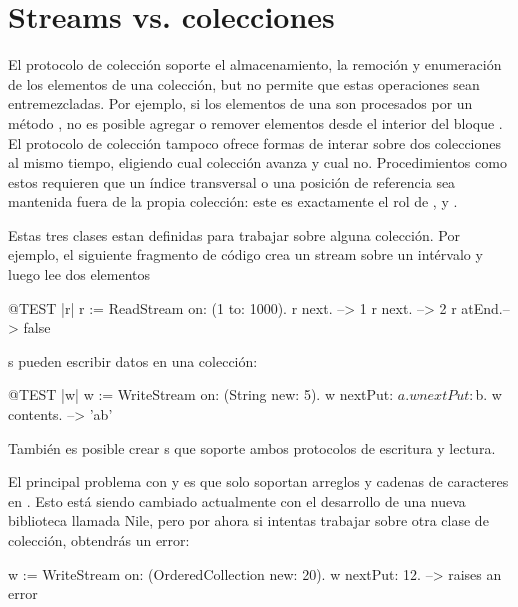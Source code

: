 \documentclass[a4paper,10pt,twoside]{book}
\begin{document}
\section{Streams vs. colecciones}

El protocolo de colecci\'on soporte el almacenamiento, la remoci\'on y enumeraci\'on de los elementos de una colecci\'on, 
but no permite que estas operaciones sean entremezcladas.  Por ejemplo, si los elementos de una  son
procesados por un m\'etodo , no es posible agregar o remover elementos desde el interior del bloque .
El protocolo de colecci\'on tampoco ofrece formas de interar sobre dos colecciones al mismo tiempo, eligiendo cual colecci\'on avanza y cual no.
Procedimientos como estos requieren que un \'indice transversal o una posici\'on de referencia sea mantenida fuera de la propia colecci\'on:
este es exactamente el rol de ,  y .

Estas tres clases estan definidas para trabajar sobre alguna colecci\'on.
Por ejemplo, el siguiente fragmento de c\'odigo crea un stream sobre un int\'ervalo y luego lee dos elementos
\begin{code}{@TEST |r|}
r := ReadStream on: (1 to: 1000).
r next.   --> 1
r next.   --> 2
r atEnd.--> false
\end{code}

s pueden escribir datos en una colecci\'on:
\begin{code}{@TEST |w|}
w := WriteStream on: (String new: 5).
w nextPut: $a.
w nextPut: $b.
w contents. -->  'ab'
\end{code}

Tambi\'en es posible crear s que soporte ambos protocolos de escritura y lectura.

El principal problema con  y  es que solo soportan arreglos y cadenas de caracteres en \pharo. Esto está siendo
cambiado actualmente con el desarrollo de una nueva biblioteca llamada Nile, pero por ahora si intentas trabajar sobre otra clase de colecci\'on, obtendr\'as un error:

\begin{code}{}
w := WriteStream on: (OrderedCollection new: 20).
w nextPut: 12. -->  raises an error
\end{code}
\end{document}
